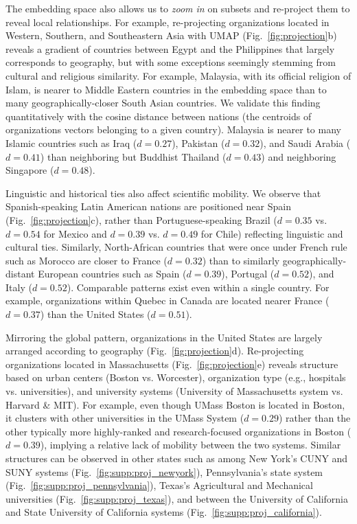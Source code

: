 \documentclass[12pt]{article} %
\begin{document}
The embedding space also allows us to \textit{zoom in} on subsets and re-project them to reveal local relationships.
For example, re-projecting organizations located in Western, Southern, and Southeastern Asia with UMAP (Fig.~\ref{fig:projection}b) reveals a gradient of countries between Egypt and the Philippines that largely corresponds to geography, but with some exceptions seemingly stemming from cultural and religious similarity.
For example, Malaysia, with its official religion of Islam, is nearer to Middle Eastern countries in the embedding space than to many geographically-closer South Asian countries.
We validate this finding quantitatively with the cosine distance between nations (the centroids of organizations vectors belonging to a given country).
Malaysia is nearer to many Islamic countries such as Iraq ($d = 0.27$), Pakistan ($d = 0.32$), and Saudi Arabia ($d = 0.41$)  than neighboring but Buddhist Thailand ($d = 0.43$) and neighboring Singapore ($d = 0.48$).

Linguistic and historical ties also affect scientific mobility.
We observe that Spanish-speaking Latin American nations are positioned near Spain (Fig.~\ref{fig:projection}c), rather than Portuguese-speaking Brazil ($d = 0.35$ vs. $d = 0.54$ for Mexico and $d = 0.39$ vs. $d = 0.49$ for Chile) reflecting linguistic and cultural ties.
Similarly, North-African countries that were once under French rule such as Morocco are closer to France ($d =0.32$) than to similarly geographically-distant European countries such as Spain ($d = 0.39$), Portugal ($d = 0.52$), and Italy ($d = 0.52$).
Comparable patterns exist even within a single country.
For example, organizations within Quebec in Canada are located nearer France ($d = 0.37$) than the United States ($d = 0.51$).


Mirroring the global pattern, organizations in the United States are largely arranged according to geography (Fig.~\ref{fig:projection}d).
Re-projecting organizations located in Massachusetts (Fig.~\ref{fig:projection}e) reveals structure based on urban centers (Boston vs. Worcester), organization type (e.g., hospitals vs. universities), and university systems (University of  Massachusetts system vs. Harvard \& MIT).
For example, even though UMass Boston is located in Boston, it clusters with other universities in the UMass System ($d = 0.29$) rather than the other typically more highly-ranked and research-focused organizations in Boston ($d = 0.39$), implying a relative lack of mobility between the two systems.
Similar structures can be observed in other states such as among New York's CUNY and SUNY systems (Fig.~\ref{fig:supp:proj_newyork}), Pennsylvania's state system (Fig.~\ref{fig:supp:proj_pennsylvania}), Texas's Agricultural and Mechanical universities (Fig.~\ref{fig:supp:proj_texas}), and between the University of California and State University of California systems (Fig.~\ref{fig:supp:proj_california}).
\end{document}
